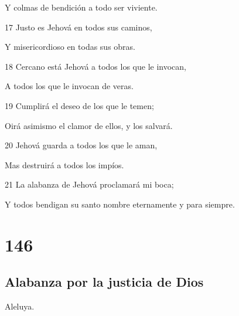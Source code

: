 \par Y colmas de bendición a todo ser viviente.
\par 17 Justo es Jehová en todos sus caminos,
\par Y misericordioso en todas sus obras.
\par 18 Cercano está Jehová a todos los que le invocan,
\par A todos los que le invocan de veras.
\par 19 Cumplirá el deseo de los que le temen;
\par Oirá asimismo el clamor de ellos, y los salvará.
\par 20 Jehová guarda a todos los que le aman,
\par Mas destruirá a todos los impíos.
\par 21 La alabanza de Jehová proclamará mi boca;
\par Y todos bendigan su santo nombre eternamente y para siempre.

\chapter{146}

\section*{Alabanza por la justicia de Dios}

\par Aleluya.

